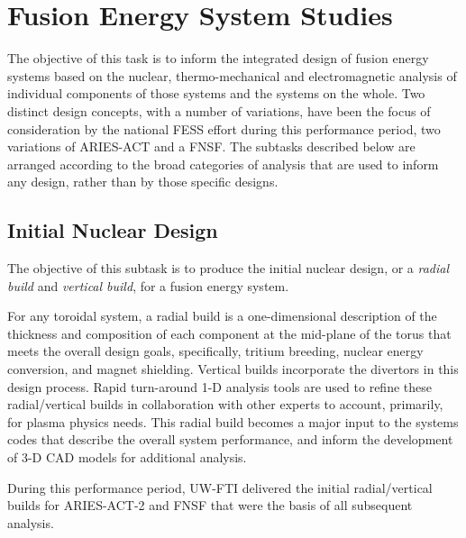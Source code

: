 \section{Fusion Energy System Studies}

The objective of this task is to inform the integrated design of fusion energy
systems based on the nuclear, thermo-mechanical and electromagnetic analysis
of individual components of those systems and the systems on the whole.  Two
distinct design concepts, with a number of variations, have been the focus of
consideration by the national \gls{FESS} effort during this performance
period, two variations of ARIES-ACT and a \gls{FNSF}.  The subtasks described
below are arranged according to the broad categories of analysis that are used
to inform any design, rather than by those specific designs.

\subsection{Initial Nuclear Design}

The objective of this subtask is to produce the initial nuclear design, or a
\emph{radial build} and \emph{vertical build}, for a fusion energy system.

For any toroidal system, a radial build is a one-dimensional description of
the thickness and composition of each component at the mid-plane of the torus
that meets the overall design goals, specifically, tritium breeding, nuclear
energy conversion, and magnet shielding.  Vertical builds incorporate the
divertors in this design process.  Rapid turn-around 1-D analysis tools are
used to refine these radial/vertical builds in collaboration with other
experts to account, primarily, for plasma physics needs.  This radial build
becomes a major input to the systems codes that describe the overall system
performance, and inform the development of 3-D CAD models for additional
analysis.

During this performance period, \gls{UW-FTI} delivered the initial
radial/vertical builds for ARIES-ACT-2 and \gls{FNSF} that were the basis of
all subsequent analysis.

